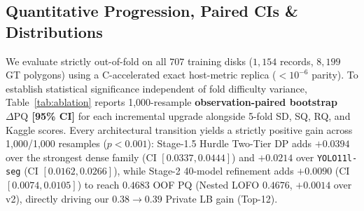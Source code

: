 \documentclass[sigconf]{acmart}
\begin{document}
\subsection{Quantitative Progression, Paired CIs \& Distributions}
We evaluate strictly out-of-fold on all $707$ training disks ($1,154$ records, $8,199$ GT polygons) using a C-accelerated exact host-metric replica ($<10^{-6}$ parity). To establish statistical significance independent of fold difficulty variance, Table~\ref{tab:ablation} reports 1,000-resample \textbf{observation-paired bootstrap $\Delta\mathrm{PQ}$ [95\% CI]} for each incremental upgrade alongside 5-fold SD, SQ, RQ, and Kaggle scores. Every architectural transition yields a strictly positive gain across 1,000/1,000 resamples ($p<0.001$): Stage-1.5 Hurdle Two-Tier DP adds $+0.0394$ over the strongest dense family (CI $[0.0337, 0.0444]$) and $+0.0214$ over \texttt{YOLO11l-seg} (CI $[0.0162, 0.0266]$), while Stage-2 40-model refinement adds $+0.0090$ (CI $[0.0074, 0.0105]$) to reach $\mathbf{0.4683}$ OOF PQ (Nested LOFO $\mathbf{0.4676}$, $+0.0014$ over v2), directly driving our $0.38\to\mathbf{0.39}$ Private LB gain (Top-12).
\end{document}
